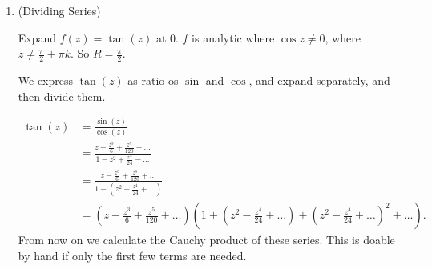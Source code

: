 \begin{enumerate}
\begin{example}
			\begin{gather*}
				f(0) = 1 \\
				f'(0) = \alpha(1+a)^{\alpha-1 }|_{z = 0} = \alpha\\
				f^{(n)}(0) = \alpha (\alpha-1) \ldots (\alpha - n + 1)
			\end{gather*}
			Hence
			\[
				f(z) = 1 + \sum_{n=0}^{\infty} \frac{\alpha (\alpha-1) \ldots (\alpha - n + 1)}{n!}z^n
			.\] 
			This is the .

			When $\alpha = m$ is integer,
			\[
				f(z) = \sum_{n=0}^{m} \binom{m}{n} z^n
			.\] 

			When $\alpha = \frac{1}{2}$,
			\[
				\sqrt{1+z}  = 1 + \frac{1}{2} z - \frac{1}{8}z^2 + \frac{3}{24} z^3 - \ldots
			.\] 
		\end{example}
		\begin{example}
			Expand $f(z) = \operatorname{Log} (1+z)$ at $0$, $R = 1$.

			Find derivatives iteratively:
			\begin{gather*}
				f(0) = 0\\
				f'(0) = \frac{1}{1+z} \big|_0 = 1\\
				f''(0) = - \frac{1}{(1+z)^2}\big|_0 = -1
			\end{gather*}
			So
			\[
				f^{(n)}(0) = (-1)^{n-1} (n-1)!
			.\] 
		\end{example}
	\item (Dividing Series)
		\begin{example}
			Expand $f(z) = \tan(z)$ at $0$. $f$ is analytic where $\cos z \neq 0$, where $z \neq  \frac{\pi}{2} + \pi k$. So $R = \frac{\pi}{2}$.

			We express  $\tan(z)$ as ratio os $\sin$ and $\cos$, and expand separately, and then divide them.

			\begin{align*}
				\tan(z) &=  \frac{\sin(z)}{\cos(z)} \\
				&= \frac{z - \frac{z^3}{6 }+ \frac{z^5}{120}+ \ldots}{1 - z^2 + \frac{z^4}{24}- \ldots} \\
				&= \frac{z - \frac{z^3}{6 }+ \frac{z^5}{120}+ \ldots}{1 - (z^2 - \frac{z^4}{24}+ \ldots)} \\
				&=  \left( z - \frac{z^3}{6 }+ \frac{z^5}{120}+ \ldots \right)\left( 1 + \left( z^2 - \frac{z^4}{24}+ \ldots \right) + \left( z^2 - \frac{z^4}{24}+ \ldots \right)^2 + \ldots \right)
			.\end{align*}
			From now on we calculate the Cauchy product of these series. This is doable by hand if only the first few terms are needed.
		\end{example}
\end{enumerate}

